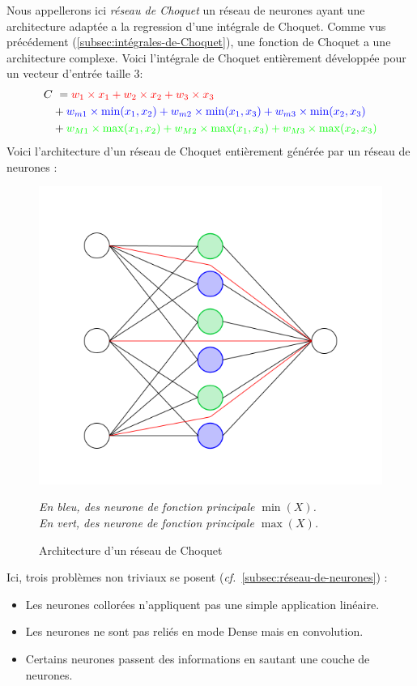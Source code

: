 Nous appellerons ici \emph{réseau de Choquet} un réseau de neurones ayant une architecture
adaptée a la regression d'une intégrale de Choquet.
Comme vus précédement (\ref{subsec:intégrales-de-Choquet}),
une fonction de Choquet a une architecture complexe.
Voici l'intégrale de Choquet entièrement développée pour un vecteur d'entrée taille $3$:
\begin{align*}
    C&\ =
    \color{red}
    w_1 \times x_1 + w_2 \times x_2 + w_3 \times x_3 \\
    \color{black}
    & +
    \color{blue}
    w_{m1} \times \min(x_1, x_2) + w_{m2} \times \min(x_1, x_3) + w_{m3} \times \min(x_2, x_3) \\
    \color{black}
    & +
    \color{green}
    w_{M1} \times \max(x_1, x_2) + w_{M2} \times \max(x_1, x_3) + w_{M3} \times \max(x_2, x_3)
\end{align*}
Voici l'architecture d'un réseau de Choquet entièrement générée par un réseau de neurones :

\begin{figure}[H]
    \center
    \includegraphics[height=\moyen]{pict/chnet1}
	\caption{Architecture d'un réseau de Choquet}
	\label{fig:chnet1}
    \vspace{-10pt}
    \begin{center}
        \tiny
        \textit{
        En bleu, des neurone de fonction principale $\min(X)$. \\
        En vert, des neurone de fonction principale $\max(X)$.
        }
    \end{center}
\end{figure}
\vspace{-12pt}
Ici, trois problèmes non triviaux se posent (\textit{cf.}\ \ref{subsec:réseau-de-neurones}) :
\begin{itemize}
    \item Les neurones collorées n'appliquent pas une simple application linéaire.
    \item Les neurones ne sont pas reliés en mode Dense mais en convolution.
    \item Certains neurones passent des informations en sautant une couche de neurones.
\end{itemize}


